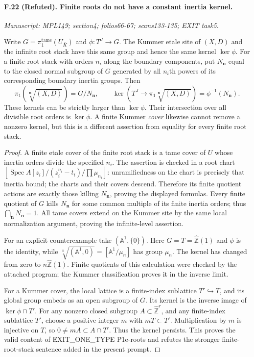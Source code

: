 \paragraph{F.22 (Refuted). Finite roots do
not have a constant inertia kernel.}
\textit{Manuscript: MPL149; section4; folios66-67; scans133-135; EXIT task5.}

Write $G=\pi_1^{\mathrm{tame}}(U_{\bar K})$ and
$\phi:T^J\to G$. The Kummer etale site of $(X,D)$ and the infinite
root stack have this same group and hence the same kernel
$\ker\phi$. For a finite root stack with orders $n_i$ along the
boundary components, put $N_{\mathbf n}$ equal to the closed normal
subgroup of $G$ generated by all $n_i$th powers of its corresponding
boundary inertia groups. Then
\[
 \pi_1(\sqrt[\mathbf n]{(X,D)})=G/N_{\mathbf n},\qquad
 \ker(T^J\to\pi_1\sqrt[\mathbf n]{(X,D)})
       =\phi^{-1}(N_{\mathbf n}).
\]
These kernels can be strictly larger than $\ker\phi$. Their
intersection over all divisible root orders is $\ker\phi$.
A finite Kummer \emph{cover} likewise cannot remove a nonzero kernel,
but this is a different assertion from equality for every finite
root stack.

\begin{proof}
A finite etale cover of the finite root stack is a tame cover of $U$
whose inertia orders divide the specified $n_i$. The assertion is
checked in a root chart $[\operatorname{Spec}A[z_i]/(z_i^{n_i}-t_i)
/\prod\mu_{n_i}]$: unramifiedness on the chart is precisely that
inertia bound; the charts and their covers descend. Therefore its
finite quotient actions are exactly those killing
$N_{\mathbf n}$, proving the displayed formulas. Every finite quotient
of $G$ kills $N_{\mathbf n}$ for some common multiple of its finite
inertia orders; thus $\bigcap_{\mathbf n}N_{\mathbf n}=1$.
All tame covers extend on the Kummer site by the same local
normalization argument, proving the infinite-level assertion.

For an explicit counterexample take $(\mathbb A^1,\{0\})$.
Here $G=T=\widehat{\mathbb Z}(1)$ and $\phi$ is the identity, while
$\sqrt[n]{(\mathbb A^1,0)}=[\mathbb A^1/\mu_n]$ has group $\mu_n$.
The kernel has changed from zero to $n\widehat{\mathbb Z}(1)$.
Finite quotients of this calculation were checked by the attached
program; the Kummer classification proves it in the inverse limit.

For a Kummer cover, the local lattice is a finite-index sublattice
$T'\hookrightarrow T$, and its global group embeds as an open subgroup
of $G$. Its kernel is the inverse image of $\ker\phi\cap T'$.
For any nonzero closed subgroup $A\subset\widehat{\mathbb Z}^{r}$,
and any finite-index sublattice $T'$, choose a positive integer $m$
with $mT\subset T'$. Multiplication by $m$ is injective on $T$, so
$0\ne mA\subset A\cap T'$. Thus the kernel persists. This proves
the valid content of EXIT\_ONE\_TYPE P1e-roots and refutes the stronger
finite-root-stack sentence added in the present prompt.
\end{proof}

